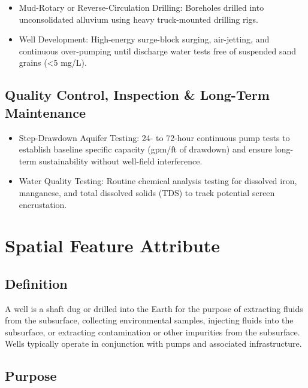 \documentclass[
  letterpaper,
  DIV=11,
  numbers=noendperiod]{scrreprt}
\begin{document}
\begin{itemize}
\item
  Mud-Rotary or Reverse-Circulation Drilling: Boreholes drilled into
  unconsolidated alluvium using heavy truck-mounted drilling rigs.
\item
  Well Development: High-energy surge-block surging, air-jetting, and
  continuous over-pumping until discharge water tests free of suspended
  sand grains (\textless5 mg/L).
\end{itemize}

\subsection{Quality Control, Inspection \& Long-Term
Maintenance}\label{quality-control-inspection-long-term-maintenance-15}

\begin{itemize}
\item
  Step-Drawdown Aquifer Testing: 24- to 72-hour continuous pump tests to
  establish baseline specific capacity (gpm/ft of drawdown) and ensure
  long-term sustainability without well-field interference.
\item
  Water Quality Testing: Routine chemical analysis testing for dissolved
  iron, manganese, and total dissolved solids (TDS) to track potential
  screen encrustation.
\end{itemize}

\section{Spatial Feature Attribute}\label{spatial-feature-attribute-10}

\subsection{Definition}\label{definition-14}

A well is a shaft dug or drilled into the Earth for the purpose of
extracting fluids from the subsurface, collecting environmental samples,
injecting fluids into the subsurface, or extracting contamination or
other impurities from the subsurface. Wells typically operate in
conjunction with pumps and associated infrastructure.

\subsection{Purpose}\label{purpose-17}
\end{document}
